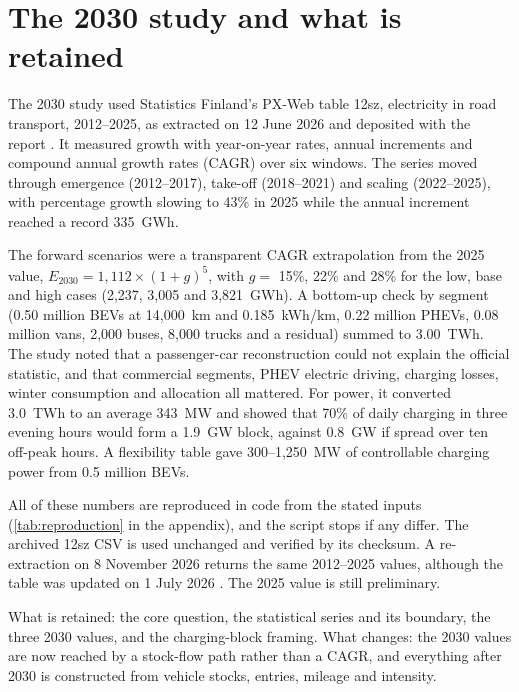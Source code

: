 \documentclass[11pt,a4paper]{article}
\begin{document}
\section{The 2030 study and what is retained}\label{sec:retained}
The 2030 study used Statistics Finland's PX-Web table 12sz, electricity in road transport, 2012--2025, as extracted on 12 June 2026 and deposited with the report \citep{merilehto2026road2030}. It measured growth with year-on-year rates, annual increments and compound annual growth rates (CAGR) over six windows. The series moved through emergence (2012--2017), take-off (2018--2021) and scaling (2022--2025), with percentage growth slowing to 43\% in 2025 while the annual increment reached a record 335~GWh.

The forward scenarios were a transparent CAGR extrapolation from the 2025 value, $E_{2030}=1{,}112\times(1+g)^5$, with $g=$ 15\%, 22\% and 28\% for the low, base and high cases (2,237, 3,005 and 3,821~GWh). A bottom-up check by segment (0.50 million BEVs at 14,000~km and 0.185~kWh/km, 0.22 million PHEVs, 0.08 million vans, 2,000 buses, 8,000 trucks and a residual) summed to 3.00~TWh. The study noted that a passenger-car reconstruction could not explain the official statistic, and that commercial segments, PHEV electric driving, charging losses, winter consumption and allocation all mattered. For power, it converted 3.0~TWh to an average 343~MW and showed that 70\% of daily charging in three evening hours would form a 1.9~GW block, against 0.8~GW if spread over ten off-peak hours. A flexibility table gave 300--1,250~MW of controllable charging power from 0.5 million BEVs.

All of these numbers are reproduced in code from the stated inputs (\cref{tab:reproduction} in the appendix), and the script stops if any differ. The archived 12sz CSV is used unchanged and verified by its checksum. A re-extraction on 8 November 2026 returns the same 2012--2025 values, although the table was updated on 1 July 2026 \citep{statfin2026_12sz}. The 2025 value is still preliminary.

What is retained: the core question, the statistical series and its boundary, the three 2030 values, and the charging-block framing. What changes: the 2030 values are now reached by a stock-flow path rather than a CAGR, and everything after 2030 is constructed from vehicle stocks, entries, mileage and intensity.

\end{document}

